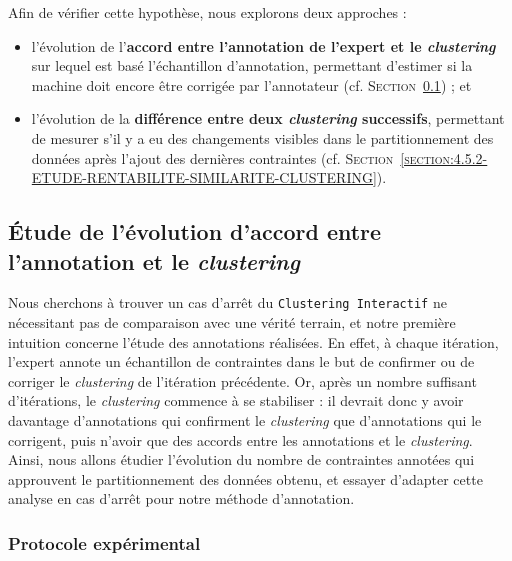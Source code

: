 	Afin de vérifier cette hypothèse, nous explorons deux approches :
	\begin{itemize}
		\item l'évolution de l'\textbf{accord entre l'annotation de l'expert et le \textit{clustering}} sur lequel est basé l'échantillon d'annotation, permettant d'estimer si la machine doit encore être corrigée par l'annotateur  (cf. \textsc{Section~\ref{section:4.5.1-ETUDE-RENTABILITE-ACCORD-ANNOTATION-CLUSTERING}}) ; et
		\item l'évolution de la \textbf{différence entre deux \textit{clustering} successifs}, permettant de mesurer s'il y a eu des changements visibles dans le partitionnement des données après l'ajout des dernières contraintes (cf. \textsc{Section~\ref{section:4.5.2-ETUDE-RENTABILITE-SIMILARITE-CLUSTERING}}).
	\end{itemize}
	
	
	\subsection{Étude de l'évolution d'accord entre l'annotation et le \textit{clustering}}
	\label{section:4.5.1-ETUDE-RENTABILITE-ACCORD-ANNOTATION-CLUSTERING}
		
		Nous cherchons à trouver un cas d'arrêt du \texttt{Clustering Interactif} ne nécessitant pas de comparaison avec une vérité terrain, et notre première intuition concerne l'étude des annotations réalisées.
		En effet, à chaque itération, l'expert annote un échantillon de contraintes dans le but de confirmer ou de corriger le \textit{clustering} de l'itération précédente.
		Or, après un nombre suffisant d'itérations, le \textit{clustering} commence à se stabiliser : il devrait donc y avoir davantage d'annotations qui confirment le \textit{clustering} que d'annotations qui le corrigent, puis n'avoir que des accords entre les annotations et le \textit{clustering}.
		Ainsi, nous allons étudier l'évolution du nombre de contraintes annotées qui approuvent le partitionnement des données obtenu, et essayer d'adapter cette analyse en cas d'arrêt pour notre méthode d'annotation.
	
		\subsubsection{Protocole expérimental}
			

